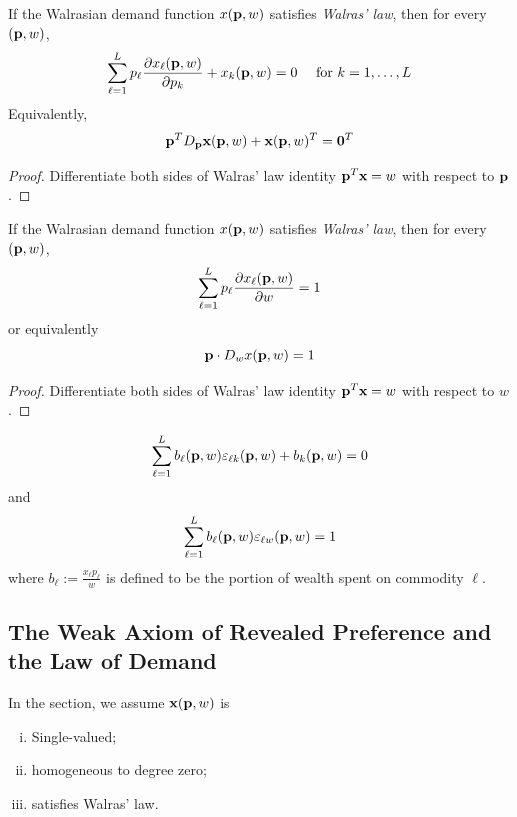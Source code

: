 \documentclass{report}
\begin{document}
 			\begin{proposition}
 				If the Walrasian demand function $x(\textbf{p}, w)$ satisfies \emph{Walras' law}, then for every $(\textbf{p}, w)$,
 				\begin{equation}
 					\sum_{\ell=1}^{L} p_{\ell} \frac{\partial x_{\ell}(\textbf{p}, w)}{\partial p_{k}}+x_{k}(\textbf{p}, w)= 0 \quad \text { for } k=1, \ldots, L
 				\end{equation}
 				Equivalently,
 				\begin{equation}
 					\textbf{p}^T D_{\textbf{p}} \textbf{x} (\textbf{p}, w) + \textbf{x}(\textbf{p}, w)^T = \textbf{0}^T
 				\end{equation}
 				\begin{proof}
 					Differentiate both sides of Walras' law identity $\textbf{p}^T \textbf{x} = w$ with respect to $\textbf{p}$.
 				\end{proof}
 			\end{proposition}
 			
 			\begin{proposition}
 				If the Walrasian demand function $x(\textbf{p}, w)$ satisfies \emph{Walras' law}, then for every $(\textbf{p}, w)$,
 				\begin{equation}
 					\sum_{\ell=1}^{L} p_{\ell} \frac{\partial x_{\ell}(\textbf{p}, w)}{\partial w}=1
 				\end{equation}
 				or equivalently
 				\begin{equation}
 					\textbf{p} \cdot D_{w} x(\textbf{p}, w) = 1
 				\end{equation}
 				\begin{proof}
 					Differentiate both sides of Walras' law identity $\textbf{p}^T \textbf{x} = w$ with respect to $w$.
 				\end{proof}
 			\end{proposition}
 		
 			\begin{proposition}[Exer. 2.E.2]
 				\begin{gather}
 					\sum_{\ell=1}^{L} b_{\ell}(\textbf{p}, w) \varepsilon_{\ell k}(\textbf{p}, w)+b_{k}(\textbf{p}, w)=0
 				\end{gather}
 				and
 				\begin{gather}
 					\sum_{\ell=1}^{L} b_{\ell}(\textbf{p}, w) \varepsilon_{\ell w}(\textbf{p}, w)=1
 				\end{gather}
 				where $b_\ell := \frac{x_\ell p_\ell}{w}$ is defined to be the portion of wealth spent on commodity $\ell$.
 			\end{proposition}
 			
 		\subsection{The Weak Axiom of Revealed Preference and the Law of Demand}
 			\begin{assumption}
 				In the section, we assume $\textbf{x}(\textbf{p}, w)$ is 
 				\begin{enumerate}[(i)]
 					\item Single-valued;
 					\item homogeneous to degree zero;
 					\item satisfies Walras' law.
 				\end{enumerate}
 			\end{assumption}
 			
\end{document}
